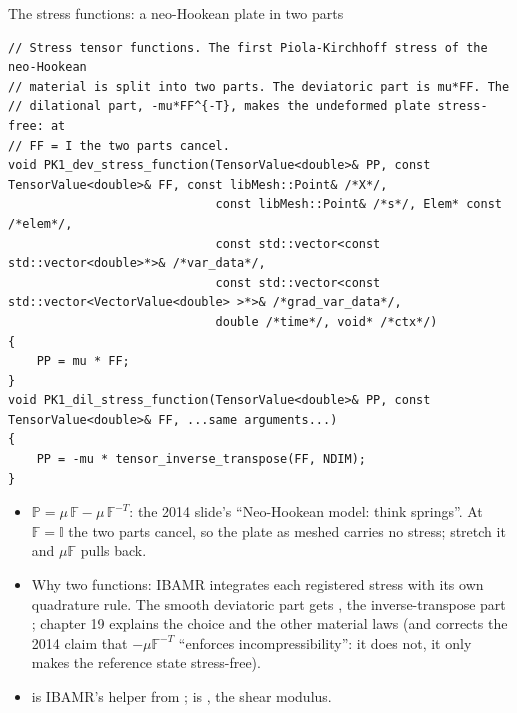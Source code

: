 \documentclass[aspectratio=169,11pt]{beamer}
\begin{document}
\begin{frame}[fragile]{The stress functions: a neo-Hookean plate in two parts}
\label{fr:pk1}
\footnotesize
\begin{lstlisting}[style=cpptiny]
// Stress tensor functions. The first Piola-Kirchhoff stress of the neo-Hookean
// material is split into two parts. The deviatoric part is mu*FF. The
// dilational part, -mu*FF^{-T}, makes the undeformed plate stress-free: at
// FF = I the two parts cancel.
void PK1_dev_stress_function(TensorValue<double>& PP, const TensorValue<double>& FF, const libMesh::Point& /*X*/,
                             const libMesh::Point& /*s*/, Elem* const /*elem*/,
                             const std::vector<const std::vector<double>*>& /*var_data*/,
                             const std::vector<const std::vector<VectorValue<double> >*>& /*grad_var_data*/,
                             double /*time*/, void* /*ctx*/)
{
    PP = mu * FF;
}
void PK1_dil_stress_function(TensorValue<double>& PP, const TensorValue<double>& FF, ...same arguments...)
{
    PP = -mu * tensor_inverse_transpose(FF, NDIM);
}
\end{lstlisting}
\begin{itemize}
  \item $\mathbb{P} = \mu\,\mathbb{F} - \mu\,\mathbb{F}^{-T}$: the 2014 slide's ``Neo-Hookean model: think springs''. At $\mathbb{F} = \mathbb{I}$ the two parts cancel, so the plate as meshed carries no stress; stretch it and $\mu\mathbb{F}$ pulls back.
  \item Why two functions: IBAMR integrates each registered stress with its own quadrature rule. The smooth deviatoric part gets , the inverse-transpose part ; chapter 19 explains the choice and the other material laws (and corrects the 2014 claim that $-\mu\mathbb{F}^{-T}$ ``enforces incompressibility'': it does not, it only makes the reference state stress-free).
  \item {} is IBAMR's helper from ;  is , the shear modulus.
\end{itemize}
\end{frame}
\end{document}
